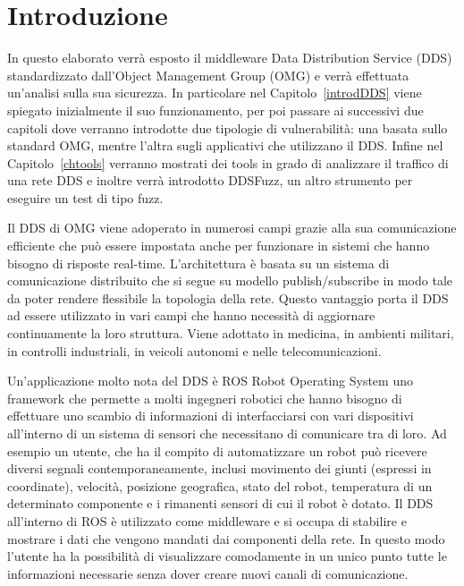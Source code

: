 \chapter{Introduzione}
In questo elaborato verrà esposto il middleware Data Distribution 
Service (DDS) standardizzato dall'Object Management Group (OMG) e 
verrà effettuata un'analisi sulla sua sicurezza.
In particolare nel Capitolo~\ref{introdDDS} 
viene spiegato inizialmente 
il suo funzionamento, per poi passare ai successivi due capitoli 
dove verranno introdotte due tipologie di vulnerabilità: una 
basata sullo standard OMG, mentre l'altra sugli applicativi
che utilizzano il DDS. Infine nel Capitolo~\ref{chtools} 
verranno 
mostrati dei tools in grado di analizzare
il traffico di una rete DDS e inoltre verrà introdotto DDSFuzz, 
un altro strumento per eseguire un test di tipo fuzz.

Il DDS di OMG viene adoperato in numerosi campi grazie alla 
sua comunicazione efficiente che può essere impostata anche 
per funzionare in sistemi che hanno bisogno di risposte 
real-time. L'architettura è basata su un sistema di comunicazione 
distribuito che si segue su modello publish/subscribe in modo 
tale da poter rendere flessibile la topologia della rete.
Questo vantaggio porta il DDS ad essere utilizzato in vari campi 
che hanno necessità di aggiornare continuamente la loro 
struttura. Viene adottato in medicina, in ambienti militari, 
in controlli industriali, in veicoli autonomi e nelle telecomunicazioni.

Un'applicazione molto nota del DDS è ROS Robot Operating System
uno framework che permette a molti ingegneri robotici 
che hanno bisogno di effettuare uno scambio di informazioni di 
interfacciarsi con vari dispositivi all'interno di un sistema
di sensori che necessitano di comunicare tra di loro.
Ad esempio un utente, che ha il compito di automatizzare 
un robot può ricevere diversi segnali
contemporaneamente, inclusi 
movimento dei giunti (espressi in coordinate), velocità, 
posizione geografica, stato del robot, temperatura di un 
determinato componente e i rimanenti sensori di cui il 
robot è dotato. Il DDS all'interno di ROS è utilizzato come 
middleware e si occupa di stabilire e mostrare i dati 
che vengono mandati dai componenti della rete. 
In questo modo l'utente ha la possibilità di visualizzare 
comodamente in un unico punto tutte le informazioni necessarie 
senza dover creare nuovi canali di comunicazione.

